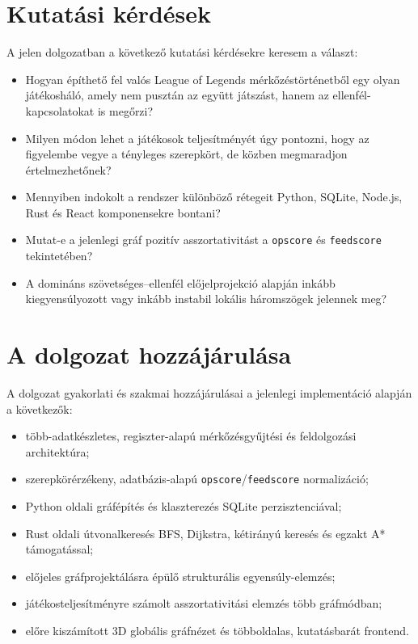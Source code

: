 \documentclass[a4paper,12pt]{report}
\begin{document}
\section{Kutatási kérdések}

A jelen dolgozatban a következő kutatási kérdésekre keresem a választ:

\begin{itemize}
    \item Hogyan építhető fel valós League of Legends mérkőzéstörténetből egy olyan játékosháló, amely nem pusztán az együtt játszást, hanem az ellenfél-kapcsolatokat is megőrzi?
    \item Milyen módon lehet a játékosok teljesítményét úgy pontozni, hogy az figyelembe vegye a tényleges szerepkört, de közben megmaradjon értelmezhetőnek?
    \item Mennyiben indokolt a rendszer különböző rétegeit Python, SQLite, Node.js, Rust és React komponensekre bontani?
    \item Mutat-e a jelenlegi gráf pozitív asszortativitást a \texttt{opscore} és \texttt{feedscore} tekintetében?
    \item A domináns szövetséges--ellenfél előjelprojekció alapján inkább kiegyensúlyozott vagy inkább instabil lokális háromszögek jelennek meg?
\end{itemize}

\section{A dolgozat hozzájárulása}

A dolgozat gyakorlati és szakmai hozzájárulásai a jelenlegi implementáció alapján a következők:

\begin{itemize}
    \item több-adatkészletes, regiszter-alapú mérkőzésgyűjtési és feldolgozási architektúra;
    \item szerepkörérzékeny, adatbázis-alapú \texttt{opscore}/\texttt{feedscore} normalizáció;
    \item Python oldali gráfépítés és klaszterezés SQLite perzisztenciával;
    \item Rust oldali útvonalkeresés BFS, Dijkstra, kétirányú keresés és egzakt A* támogatással;
    \item előjeles gráfprojektálásra épülő strukturális egyensúly-elemzés;
    \item játékosteljesítményre számolt asszortativitási elemzés több gráfmódban;
    \item előre kiszámított 3D globális gráfnézet és többoldalas, kutatásbarát frontend.
\end{itemize}
\end{document}
